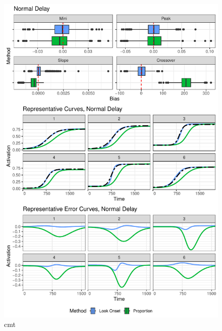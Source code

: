 \documentclass{article}
\begin{document}
\begin{figure}[H]
\centering
\includegraphics{rep_and_diff_normal_delay.pdf}
\caption{cmt}
\label{fig:panel_normal_delay}
\end{figure}
\end{document}
